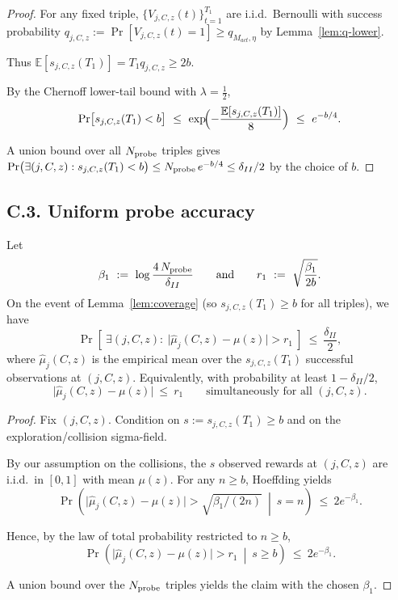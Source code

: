 \begin{proof}
For any fixed triple, $\{V_{j,C,z}(t)\}_{t=1}^{T_1}$ are i.i.d.\ Bernoulli with success probability $q_{j,C,z}:=\Pr[V_{j,C,z}(t)=1]\ge q_{M_{act},\eta}$ by Lemma~\ref{lem:q-lower}. 

Thus
$\mathbb E[s_{j,C,z}(T_1)]=T_1 q_{j,C,z}\ge 2b$.

By the Chernoff lower-tail bound with $\lambda=\tfrac12$,
\[
\Pr\bigl[s_{j,C,z}(T_1)< b\bigr]\ \le\ \exp\!\Bigl(-\frac{\mathbb E[s_{j,C,z}(T_1)]}{8}\Bigr)\ \le\ e^{-b/4}.
\]

A union bound over all $N_{\text{probe}}$ triples gives
$\Pr\bigl(\exists (j,C,z): s_{j,C,z}(T_1)< b\bigr)\le N_{\text{probe}}\, e^{-b/4}\le \delta_{II}/2$ by the choice of $b$.
\end{proof}

\subsection*{C.3.\; Uniform probe accuracy}

\begin{lemma}\label{lem:probe-accuracy}
Let
\[
\beta_1\ :=\ \log\frac{4\,\NumProbes}{\delta_{II}}
\qquad\text{and}\qquad
r_1\ :=\ \sqrt{\frac{\beta_1}{2b}}.
\]
On the event of Lemma~\ref{lem:coverage} (so $s_{j,C,z}(T_1)\ge b$ for all triples), we have
\[
\Pr\!\left[\ \exists (j,C,z):\ \big|\widehat\mu_j(C,z)-\mu(z)\big|> r_1\ \right]\ \le\ \frac{\delta_{II}}{2},
\]
where $\widehat\mu_j(C,z)$ is the empirical mean over the $s_{j,C,z}(T_1)$ successful observations at $(j,C,z)$.
Equivalently, with probability at least $1-\delta_{II}/2$,
\[
\big|\widehat\mu_j(C,z)-\mu(z)\big|\ \le\ r_1
\qquad\text{simultaneously for all }(j,C,z).
\]
\end{lemma}

\begin{proof}
Fix $(j,C,z)$. Condition on $s:=s_{j,C,z}(T_1)\ge b$ and on the exploration/collision sigma-field.

By our assumption on the collisions, the $s$ observed rewards at $(j,C,z)$ are i.i.d.\ in $[0,1]$ with mean $\mu(z)$.
For any $n\ge b$, Hoeffding yields
\[
\Pr\!\left(\big|\widehat\mu_j(C,z)-\mu(z)\big|>\sqrt{\beta_1/(2n)}\ \middle|\ s=n\right)\ \le\ 2e^{-\beta_1}.
\]

Hence, by the law of total probability restricted to $n\ge b$,
\[
\Pr\!\left(\big|\widehat\mu_j(C,z)-\mu(z)\big|>r_1\ \middle|\ s\ge b\right)\ \le\ 2e^{-\beta_1}.
\]

A union bound over the $N_{\text{probe}}$ triples yields the claim with the chosen $\beta_1$.
\end{proof}

